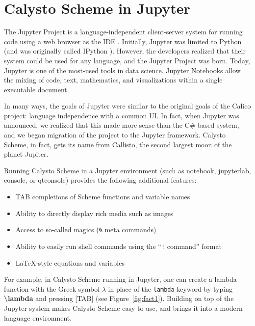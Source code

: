 \documentclass[acmsmall,screen,anonymous,review]{acmart}
\begin{document}

\section{Calysto Scheme in Jupyter}

The Jupyter Project is a language-independent client-server system for
running code using a web browser as the IDE
\cite{Kluyver2016jupyter}. Initially, Jupyter was limited to Python
(and was originally called IPython \cite{PER-GRA:2007}). However, the
developers realized that their system could be used for any language,
and the Jupyter Project was born. Today, Jupyter is one of the
most-used tools in data science. Jupyter Notebooks allow the mixing of
code, text, mathematics, and visualizations within a single executable
document.

In many ways, the goals of Jupyter were similar to the original goals of the
Calico project: language independence with a common UI. In fact, when Jupyter
was announced, we realized that this made more sense than the C\#-based system,
and we began migration of the project to the Jupyter framework. Calysto Scheme,
in fact, gets its name from Callisto, the second largest moon of the planet
Jupiter.

Running Calysto Scheme in a Jupyter environment (such as notebook, jupyterlab,
console, or qtconsole) provides the following additional features:

\begin{itemize}
\item TAB completions of Scheme functions and variable names
\item Ability to directly display rich media such as images
\item Access to so-called magics (\texttt{\%} meta commands)
\item Ability to easily run shell commands using the ``\texttt{!} command'' format
\item \LaTeX-style equations and variables
\end{itemize}

For example, in Calysto Scheme running in Jupyter, one can create a lambda
function with the Greek symbol $\lambda$ in place of the \texttt{lambda}
keyword by typing \textbf{\textbackslash lambda} and pressing [TAB] (see
Figure~\ref{fig:fact1}). Building on top of the Jupyter system makes Calysto
Scheme easy to use, and brings it into a modern language environment.
\end{document}
